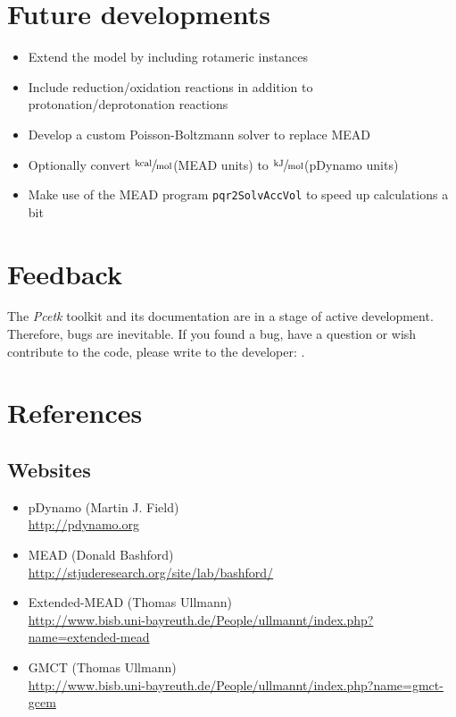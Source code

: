 \documentclass[12pt]{article}
\newcommand{\modulename}{\textit{Pcetk}\xspace}
\newcommand{\kcal}{$\sfrac{\rm kcal}{\rm mol}$\xspace}
\newcommand{\kjoule}{$\sfrac{\rm kJ}{\rm mol}$\xspace}
\begin{document}
{%
\section{Future developments}
\begin{itemize}
\itemsep0pt
  \item Extend the model by including rotameric instances
  \item Include reduction/oxidation reactions in addition to protonation/deprotonation reactions
  \item Develop a custom Poisson-Boltzmann solver to replace MEAD
  \item Optionally convert \kcal (MEAD units) to \kjoule (pDynamo units)
  \item Make use of the MEAD program {\tt pqr2SolvAccVol} to speed up calculations a bit
\end{itemize}


\section{Feedback}
The \modulename toolkit and its documentation
are in a stage of active development.
%
Therefore,
bugs are inevitable.
%
If you found a bug,
have a question or wish contribute to the code,
please write to
the developer:
.


\section{References}
\renewcommand{\refname}{}
\vspace*{-1cm}


\begingroup
    {\small
        \setlength{\bibsep}{8pt}
        
    }
\endgroup


\subsection*{Websites}

\begin{itemize}
\itemsep0em
  \item pDynamo (Martin J. Field)\\ \url{http://pdynamo.org}
  \item MEAD (Donald Bashford)\\ \url{http://stjuderesearch.org/site/lab/bashford/}
  \item Extended-MEAD (Thomas Ullmann)\\ \url{http://www.bisb.uni-bayreuth.de/People/ullmannt/index.php?name=extended-mead}
  \item GMCT (Thomas Ullmann)\\ \url{http://www.bisb.uni-bayreuth.de/People/ullmannt/index.php?name=gmct-gcem}
\end{itemize}
\end{document}
